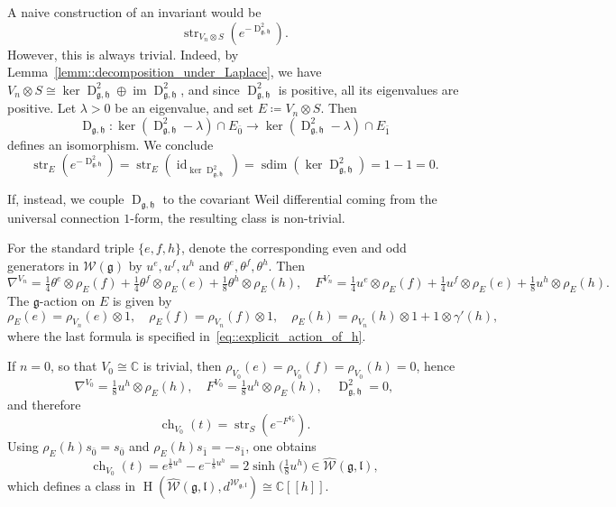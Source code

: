 \documentclass[11pt]{amsart}
\newcommand{\sdim}{\operatorname{sdim}}
\newcommand{\str}{\operatorname{str}}
\renewcommand{\Im}{\operatorname{im}}
\newcommand{\Dirac}{\operatorname{D}}
\def\WW{{\mathcal{W}}}
\def\Weil{{\mathcal{W}(\gg)}}
\def\CC{{\mathbb C}}
\def\hh{{\mathfrak h}}
\def\H{{\operatorname{H}}}
\def\ll{{\mathfrak l}}
\def\gg{{\mathfrak{g}}}
\theoremstyle{plain}
\theoremstyle{remark}
\theoremstyle{definition}
\numberwithin{equation}{section}
\theoremstyle{remark}
\begin{document}
A naive construction of an invariant would be 
\begin{equation}
 \str_{V_{n}\otimes S}(e^{-\Dirac_{\gg,\mathfrak{h}}^{2}}).
\end{equation}
However, this is always trivial. Indeed, by Lemma~\ref{lemm::decomposition_under_Laplace}, we have
$V_{n}\otimes S\cong \ker \Dirac_{\gg,\hh}^{2}\oplus \Im \Dirac_{\gg,\hh}^{2}$, and since $\Dirac_{\gg,\hh}^{2}$ is positive,
all its eigenvalues are positive. Let $\lambda>0$ be an eigenvalue, and set $E\coloneqq V_{n}\otimes S$. Then 
\begin{equation}
 \Dirac_{\gg,\hh} : \ker (\Dirac_{\gg,\hh}^{2}-\lambda) \cap E_{\bar{0}} \to \ker(\Dirac_{\gg,\hh}^{2}-\lambda)\cap E_{\bar{1}}
\end{equation}
defines an isomorphism. We conclude
\begin{equation}
\str_{E}(e^{-\Dirac_{\gg,\hh}^{2}})=\str_{E}(\operatorname{id}_{\ker \Dirac_{\gg,\hh}^{2}})=\sdim({\ker \Dirac_{\gg,\hh}^{2}})=1-1=0.
\end{equation}

If, instead, we couple $\Dirac_{\gg,\hh}$ to the covariant Weil differential coming from the universal connection $1$-form, the resulting class is non-trivial.

For the standard triple $\{e,f,h\}$, denote the corresponding even and odd
generators in $\Weil$ by $u^{e},u^{f},u^{h}$ and
$\theta^{e},\theta^{f},\theta^{h}$. Then
\begin{equation}
\nabla^{V_{n}}=\tfrac{1}{4}\theta^{e}\otimes\rho_{E}(f)
+\tfrac{1}{4}\theta^{f}\otimes\rho_{E}(e)
+\tfrac{1}{8}\theta^{h}\otimes\rho_{E}(h),\quad
F^{V_{n}}=\tfrac{1}{4}u^{e}\otimes\rho_{E}(f)
+\tfrac{1}{4}u^{f}\otimes\rho_{E}(e)
+\tfrac{1}{8}u^{h}\otimes\rho_{E}(h).
\end{equation}
The $\gg$-action on $E$ is given by
\begin{equation}
\rho_{E}(e)=\rho_{V_{n}}(e)\otimes1,\quad
\rho_{E}(f)=\rho_{V_{n}}(f)\otimes1,\quad
\rho_{E}(h)=\rho_{V_{n}}(h)\otimes1+1\otimes\gamma'(h),
\end{equation}
where the last formula is specified in~\eqref{eq::explicit_action_of_h}.

If $n=0$, so that $V_{0}\cong\CC$ is trivial, then
$\rho_{V_{0}}(e)=\rho_{V_{0}}(f)=\rho_{V_{0}}(h)=0$, hence
\begin{equation}
\nabla^{V_{0}}=\tfrac{1}{8}u^{h}\otimes\rho_{E}(h),\quad
F^{V_{0}}=\tfrac{1}{8}u^{h}\otimes\rho_{E}(h),\quad
\Dirac_{\gg,\hh}^{2}=0,
\end{equation}
and therefore
\begin{equation}
\operatorname{ch}_{V_{0}}(t)=\str_{S}(e^{-F^{V_{0}}}).
\end{equation}
Using $\rho_{E}(h)s_{\bar{0}}=s_{\bar{0}}$ and
$\rho_{E}(h)s_{\bar{1}}=-s_{\bar{1}}$, one obtains
\begin{equation}
\operatorname{ch}_{V_{0}}(t)
=e^{\tfrac{1}{8}u^{h}}-e^{-\tfrac{1}{8}u^{h}}
=2\sinh\!\bigl(\tfrac{1}{8}u^{h}\bigr)
\in\widehat{\WW}(\gg,\ll),
\end{equation}
which defines a class in
$\H(\widehat{\WW}(\gg,\ll),d^{\WW_{\gg,\ll}})\cong\CC[[h]]$.
\end{document}
